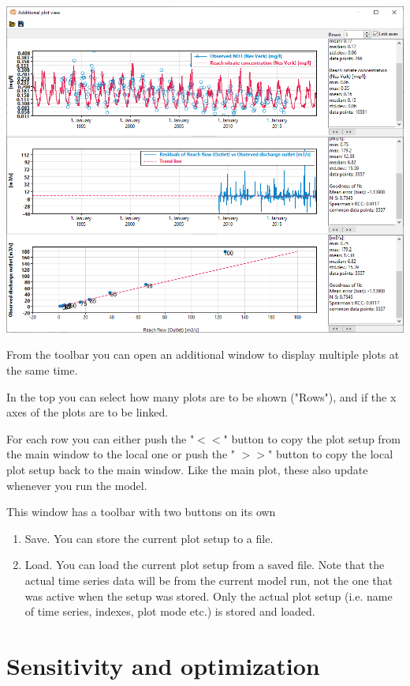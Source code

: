 \documentclass[11pt]{article}
\theoremstyle{definition}
\begin{document}
\begin{center}
\includegraphics[width=\linewidth]{img/additionalplotview}
\end{center}

From the toolbar you can open an additional window to display multiple plots at the same time.

In the top you can select how many plots are to be shown ("Rows"), and if the x axes of the plots are to be linked.

For each row you can either push the "$<<$" button to copy the plot setup from the main window to the local one or push the " $>>$" button to copy the local plot setup back to the main window. Like the main plot, these also update whenever you run the model.

This window has a toolbar with two buttons on its own
\begin{enumerate}
\item Save. You can store the current plot setup to a file.
\item Load. You can load the current plot setup from a saved file. Note that the actual time series data will be from the current model run, not the one that was active when the setup was stored. Only the actual plot setup (i.e. name of time series, indexes, plot mode etc.) is stored and loaded.
\end{enumerate}

\section{Sensitivity and optimization}
\end{document}
